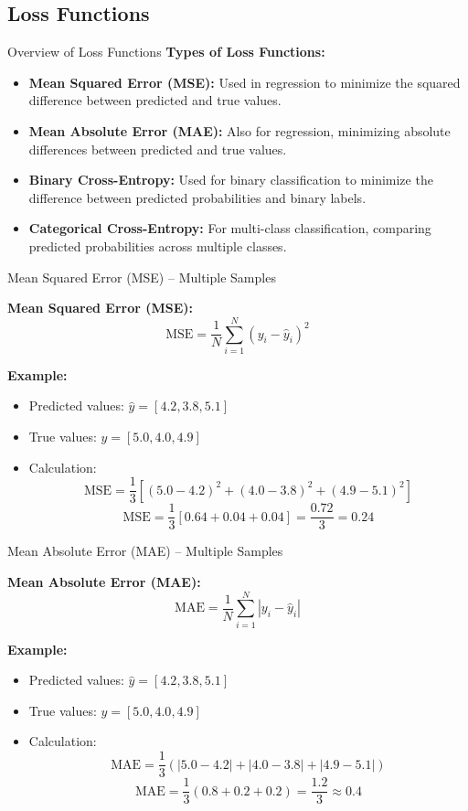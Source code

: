 \documentclass[serif, aspectratio=169]{beamer}
\begin{document}
\subsection{Loss Functions}
\begin{frame}{Overview of Loss Functions}
    \textbf{Types of Loss Functions:}
    \begin{itemize}
        \item \textbf{Mean Squared Error (MSE):} Used in regression to minimize the squared difference between predicted and true values.
        \item \textbf{Mean Absolute Error (MAE):} Also for regression, minimizing absolute differences between predicted and true values.
        \item \textbf{Binary Cross-Entropy:} Used for binary classification to minimize the difference between predicted probabilities and binary labels.
        \item \textbf{Categorical Cross-Entropy:} For multi-class classification, comparing predicted probabilities across multiple classes.
    \end{itemize}
\end{frame}
\begin{frame}{Mean Squared Error (MSE) – Multiple Samples}

    \textbf{Mean Squared Error (MSE):}
    \[
    \text{MSE} = \frac{1}{N} \sum_{i=1}^{N} \left( y_i - \hat{y}_i \right)^2
    \]

    \textbf{Example:}
    \begin{itemize}
        \item Predicted values: \( \hat{y} = [4.2, 3.8, 5.1] \)
        \item True values: \( y = [5.0, 4.0, 4.9] \)
        \item Calculation:
        \[
        \text{MSE} = \frac{1}{3} \left[ (5.0 - 4.2)^2 + (4.0 - 3.8)^2 + (4.9 - 5.1)^2 \right]
        \]
        \[
        \text{MSE} = \frac{1}{3} \left[ 0.64 + 0.04 + 0.04 \right] = \frac{0.72}{3} = 0.24
        \]
    \end{itemize}
\end{frame}

\begin{frame}{Mean Absolute Error (MAE) – Multiple Samples}

    \textbf{Mean Absolute Error (MAE):}
    \[
    \text{MAE} = \frac{1}{N} \sum_{i=1}^{N} \left| y_i - \hat{y}_i \right|
    \]

    \textbf{Example:}
    \begin{itemize}
        \item Predicted values: \( \hat{y} = [4.2, 3.8, 5.1] \)
        \item True values: \( y = [5.0, 4.0, 4.9] \)
        \item Calculation:
        \[
        \text{MAE} = \frac{1}{3} \left( |5.0 - 4.2| + |4.0 - 3.8| + |4.9 - 5.1| \right)
        \]
        \[
        \text{MAE} = \frac{1}{3} (0.8 + 0.2 + 0.2) = \frac{1.2}{3} \approx 0.4
        \]
    \end{itemize}
\end{frame}
\end{document}
